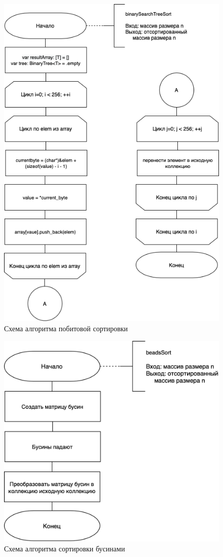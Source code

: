 \begin{figure}[h!]
    \centering
    \includegraphics[width=0.8\linewidth]{inc/img/radix_sort}
    \caption{Схема алгоритма побитовой сортировки}
    \label{fig:beads}
\end{figure}

\begin{figure}[h!]
	\centering
	\includegraphics[width=0.8\linewidth]{inc/img/bead_sort_3}
	\caption{Схема алгоритма сортировки бусинами}
	\label{fig:radix}
\end{figure}
\clearpage

